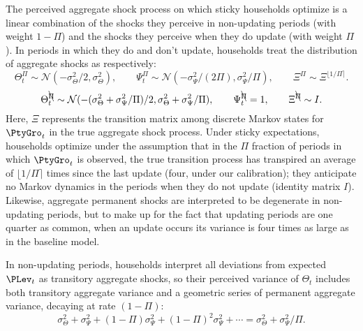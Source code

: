 The perceived aggregate shock process on which sticky households optimize is a linear combination of the shocks they perceive in non-updating periods (with weight $1-\Pi$) and the shocks they perceive when they do update (with weight $\Pi$).  In periods in which they do and don't update, households treat the distribution of aggregate shocks as respectively:
\begin{equation*}
	\Theta_t^{\Pi} \sim \mathcal{N}(-\sigma_\Theta^2/2,\sigma_\Theta^2), \qquad \Psi_t^{\Pi} \sim \mathcal{N}(-\sigma_\Psi^2/(2\Pi),\sigma_\Psi^2/\Pi), \qquad \Xi^{\Pi} \sim \Xi^{\lfloor 1/\Pi \rceil}.
\end{equation*}
\begin{equation*}
	\Theta_t^{\bcancel{\Pi}} \sim \mathcal{N}(-(\sigma_\Theta^2 + \sigma_\Psi^2/\Pi)/2,\sigma_\Theta^2 + \sigma_\Psi^2/\Pi), \qquad \Psi_t^{\bcancel{\Pi}} = 1, \qquad \Xi^{\bcancel{\Pi}} \sim I.
\end{equation*}
Here, $\Xi$ represents the transition matrix among discrete Markov states for $\PtyGro_t$ in the true aggregate shock process.  Under sticky expectations, households optimize under the assumption that in the $\Pi$ fraction of periods in which $\PtyGro_t$ is observed, the true transition process has transpired an average of $\lfloor 1/\Pi \rceil$ times since the last update (four, under our calibration); they anticipate no Markov dynamics in the periods when they do not update (identity matrix $I$).  Likewise, aggregate permanent shocks are interpreted to be degenerate in non-updating periods, but to make up for the fact that updating periods are one quarter as common, when an update occurs its variance is four times as large as in the baseline model.

In non-updating periods, households interpret all deviations from expected $\PLev_t$ as transitory aggregate shocks, so their perceived variance of $\Theta_t$ includes both transitory aggregate variance and a geometric series of permanent aggregate variance, decaying at rate $(1-\Pi)$:
\begin{equation*}
\sigma_\Theta^2 + \sigma_\Psi^2 + (1-\Pi) \sigma_\Psi^2 + (1-\Pi)^2 \sigma_\Psi^2 + \cdots = \sigma_\Theta^2 + \sigma_\Psi^2/\Pi.
\end{equation*}

